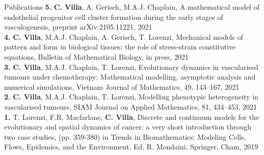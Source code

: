 \documentclass{resume} %
\begin{document}
\begin{rSection}{Publications}
{\bf 5.} {\bf C. Villa}, A. Gerisch, M.A.J. Chaplain, A mathematical model of endothelial progenitor cell cluster formation during the early stages of vasculogenesis, preprint arXiv:2105.11221, 2021 \\
{\bf 4.} {\bf C. Villa}, M.A.J. Chaplain, A. Gerisch, T. Lorenzi, {Mechanical models of pattern and form in biological tissues: the role of stress-strain constitutive equations}, Bulletin of Mathematical Biology, in press, 2021 \\
{\bf 3.} {\bf C. Villa}, M.A.J. Chaplain, T. Lorenzi, {Evolutionary dynamics in vascularised tumours under chemotherapy: Mathematical modelling, asymptotic analysis and numerical simulations}, Vietnam Journal of Mathematics, 49, 143–167, 2021 \\
{\bf 2.} {\bf C. Villa}, M.A.J. Chaplain, T. Lorenzi, {Modelling phenotypic heterogeneity in vascularised tumours}, SIAM Journal on Applied Mathematics, 81, 434–453, 2021 \\
{\bf 1.} T. Lorenzi, F.R. Macfarlane, {\bf C. Villa}, {Discrete and continuum models for the evolutionary and spatial dynamics of cancer: a very short introduction through two case studies}, (pp. 359-380) in Trends in Biomathematics: Modeling Cells, Flows, Epidemics, and the Environment, Ed. R. Mondaini, Springer, Cham, 2019
\end{rSection}
\end{document}

